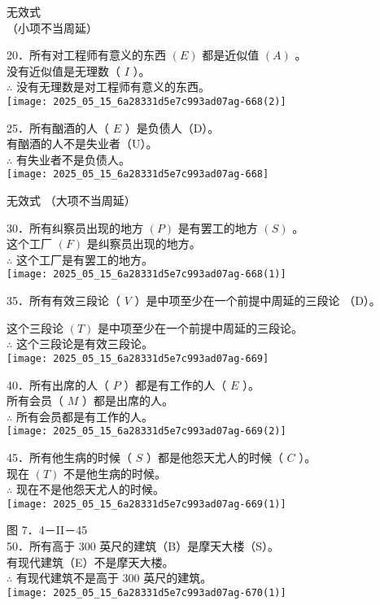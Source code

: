 无效式\\
（小项不当周延）

20．所有对工程师有意义的东西 $(E)$ 都是近似值 $(A)$ 。\\
没有近似值是无理数（ $I$ ）。\\
$\therefore$ 没有无理数是对工程师有意义的东西。\\
\texttt{[image: 2025\_05\_15\_6a28331d5e7c993ad07ag-668(2)]}

25．所有酗酒的人（ $E$ ）是负债人（D）。\\
有酗酒的人不是失业者（U）。\\
$\therefore$ 有失业者不是负债人。\\
\texttt{[image: 2025\_05\_15\_6a28331d5e7c993ad07ag-668]}

无效式 （大项不当周延）

30．所有纠察员出现的地方 $(P)$ 是有罢工的地方 $(S)$ 。\\
这个工厂 $(F)$ 是纠察员出现的地方。\\
$\therefore$ 这个工厂是有罢工的地方。\\
\texttt{[image: 2025\_05\_15\_6a28331d5e7c993ad07ag-668(1)]}

35．所有有效三段论（ $V$ ）是中项至少在一个前提中周延的三段论 （D）。

这个三段论 $(T)$ 是中项至少在一个前提中周延的三段论。\\
$\therefore$ 这个三段论是有效三段论。\\
\texttt{[image: 2025\_05\_15\_6a28331d5e7c993ad07ag-669]}

40．所有出席的人（ $P$ ）都是有工作的人（ $E$ ）。\\
所有会员（ $M$ ）都是出席的人。\\
$\therefore$ 所有会员都是有工作的人。\\
\texttt{[image: 2025\_05\_15\_6a28331d5e7c993ad07ag-669(2)]}

45．所有他生病的时候（ $S$ ）都是他怨天尤人的时候（ $C$ ）。\\
现在 $(T)$ 不是他生病的时候。\\
$\therefore$ 现在不是他怨天尤人的时候。\\
\texttt{[image: 2025\_05\_15\_6a28331d5e7c993ad07ag-669(1)]}

图 7．4－II－45\\
50．所有高于 300 英尺的建筑（B）是摩天大楼（S）。\\
有现代建筑（E）不是摩天大楼。\\
$\therefore$ 有现代建筑不是高于 300 英尺的建筑。\\
\texttt{[image: 2025\_05\_15\_6a28331d5e7c993ad07ag-670(1)]}

